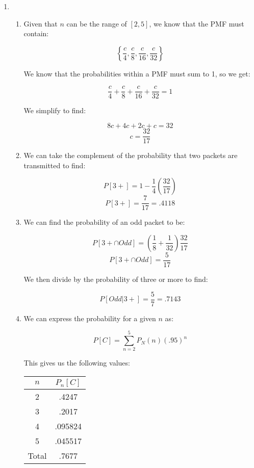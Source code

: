 \begin{enumerate}
\begin{enumerate}
    \end{enumerate}

  \item

    \begin{enumerate}

      \item Given that $n$ can be the range of $[2,5]$, we know that the PMF must contain:

        $$\left\{ \frac{c}{4},\frac{c}{8},\frac{c}{16},\frac{c}{32} \right\}$$

        We know that the probabilities within a PMF must sum to 1, so we get:

        $$\frac{c}{4}+\frac{c}{8}+\frac{c}{16}+\frac{c}{32}=1$$

        We simplify to find:

        $$8c+4c+2c+c=32$$
        $$\boxed{c=\frac{32}{17}}$$

      \item We can take the complement of the probability that two packets are transmitted to find:

        $$P[3+]=1-\frac{1}{4}\left( \frac{32}{17} \right)$$
        $$\boxed{P[3+]=\frac{7}{17}=.4118}$$

      \item We can find the probability of an odd packet to be:

        $$P[3+\cap Odd]=\left( \frac{1}{8}+\frac{1}{32} \right)\frac{32}{17}$$
        $$P[3+\cap Odd]=\frac{5}{17}$$

        We then divide by the probability of three or more to find:

        $$\boxed{P[Odd|3+]=\frac{5}{7}=.7143}$$

      \item We can express the probability for a given $n$ as:

        $$P[C]=\sum_{n=2}^5 P_N(n)(.95)^n$$

        This gives us the following values:

        \begin{center}
          \begin{tabular}[H]{|c|c|}
           \hline
           $n$ & $P_n[C]$\\
           \hline
           2 & .4247\\
           \hline
           3 & .2017\\
           \hline
           4 & .095824\\
           \hline
           5 & .045517\\
           \hline
           Total & .7677\\
           \hline
          \end{tabular}
        \end{center}


\end{enumerate}
\end{enumerate}
